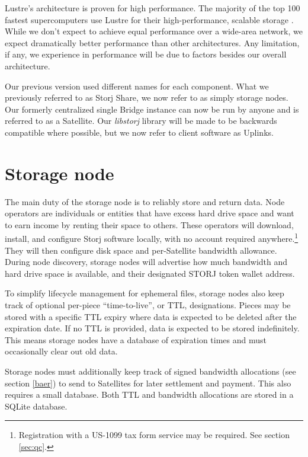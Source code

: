 \documentclass[8pt,fleqn,openany]{book}
\begin{document}
Lustre's architecture is proven for high performance. The majority of the top
100 fastest supercomputers use Lustre for their high-performance, scalable
storage \cite{lustre}. While we don't expect to achieve equal performance over
a wide-area network, we expect dramatically better performance than other
architectures. Any limitation, if any, we experience in performance will be
due to factors besides our overall architecture.

Our previous version used different names for each component. What we
previously referred to as Storj Share, we now refer to as simply storage nodes.
Our formerly centralized single Bridge instance can now be run by anyone and
is referred to as a Satellite.
Our {\em libstorj} library will be made to be backwards
compatible where possible, but we now refer to client software as
Uplinks.

\section{Storage node}\label{sec:concrete-storage-nodes}

The main duty of the storage node is to reliably store and return data.
Node operators
are individuals or entities that have excess hard drive space and want to earn
income by renting their space to others. These operators will
download,
install, and configure Storj software locally, with no account required
anywhere.\footnote{Registration with a US-1099 tax form service may be
required. See section \ref{sec:qc}.}
They will then configure disk space and per-Satellite bandwidth allowance.
During node discovery, storage nodes will advertise how much bandwidth and
hard drive space is available, and their designated STORJ token wallet address.

To simplify lifecycle management for ephemeral files,
storage nodes also keep track of optional per-piece ``time-to-live'', or TTL,
designations.
Pieces may be stored with a specific TTL expiry where data is expected to
be deleted after the expiration date. If no TTL is provided, data is expected
to be stored indefinitely. This means storage nodes have a database of
expiration
times and must occasionally clear out old data.

Storage nodes must additionally keep track of signed bandwidth allocations
(see section \ref{baer}) to send to
Satellites for later settlement and payment. This also requires a small
database. Both TTL and bandwidth allocations are stored in a SQLite
\cite{sqlite} database.
\end{document}
